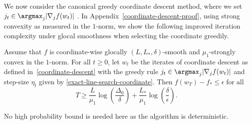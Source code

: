 \documentclass[10pt]{article} %
\begin{document}
We now consider the canonical greedy coordinate descent method, where we set $j_{t} \in\argmax_{j} |\nabla_{j} f(w_{t})|$ \cite{nutini2015coordinate}. In Appendix~\ref{coordinate-descent-proof}, using strong convexity as measured in the $1$-norm, we show the following improved iteration complexity under glocal smoothness when selecting the coordinate greedily.
\begin{theorem}
    \label{coordinate-descent-theorem-greedy}
    Assume that $f$ is coordinate-wise glocally $(L, L_*, \delta)$-smooth and $\mu_1$-strongly convex in the $1$-norm. For all $t \geq 0$, let $w_t$ be the iterates of coordinate descent as defined in~\eqref{coordinate-descent} with the greedy rule $j_{t} \in\argmax_{j} |\nabla_{j} f(w_{t})|$ and step-size $\eta_t$ given by \eqref{exact-line-search-coordinate}. Then $f(w_T) - f_* \leq \epsilon \;\text{for all}$
    \begin{equation*}
        T \geq
        \frac{L}{\mu_1}\log\left(\frac{\Delta_{0}}{\delta}\right) + \frac{L_*}{\mu_1}\log\left(\frac{\delta}{\epsilon}\right).
    \end{equation*}
\end{theorem}
No high probability bound is needed here as the algorithm is deterministic. %

\end{document}
